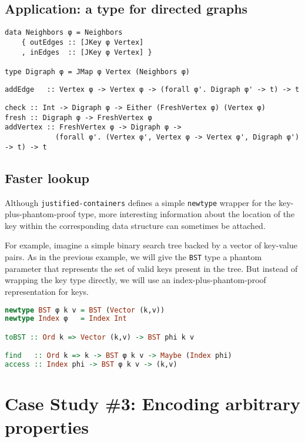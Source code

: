 \documentclass[format=sigplan, review=false, screen=true]{acmart}
\begin{document}
\subsection{Application: a type for directed graphs}

\begin{verbatim}
data Neighbors φ = Neighbors
    { outEdges :: [JKey φ Vertex]
    , inEdges  :: [JKey φ Vertex] }
  
type Digraph φ = JMap φ Vertex (Neighbors φ)
\end{verbatim}

\begin{verbatim}
addEdge   :: Vertex φ -> Vertex φ -> (forall φ'. Digraph φ' -> t) -> t
\end{verbatim}


\begin{verbatim}
check :: Int -> Digraph φ -> Either (FreshVertex φ) (Vertex φ)
fresh :: Digraph φ -> FreshVertex φ
addVertex :: FreshVertex φ -> Digraph φ ->
            (forall φ'. (Vertex φ', Vertex φ -> Vertex φ', Digraph φ') -> t) -> t
\end{verbatim}

\subsection{Faster lookup}
Although \texttt{justified-containers} defines a simple \texttt{newtype} wrapper for
the key-plus-phantom-proof type, more interesting information about the location of
the key within the corresponding data structure can sometimes be attached.

For example, imagine a simple binary search tree backed by a vector of key-value pairs.
As in the previous example, we will give the \texttt{BST} type a phantom parameter that
represents the set of valid keys present in the tree. But instead of wrapping the key
type directly, we will use an index-plus-phantom-proof representation for keys.

\begin{lstlisting}[language=Haskell]
newtype BST φ k v = BST (Vector (k,v))
newtype Index φ   = Index Int

toBST :: Ord k => Vector (k,v) -> BST phi k v

find   :: Ord k => k -> BST φ k v -> Maybe (Index phi)
access :: Index phi -> BST φ k v -> (k,v)
\end{lstlisting}


\section{Case Study \#3: Encoding arbitrary properties}
\end{document}
